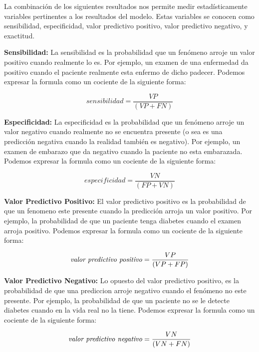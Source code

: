\documentclass[letterpaper, spanish, 11pt]{report}
\begin{document}
La combinación de los siguientes resultados nos permite medir estadísticamente variables pertinentes a los resultados del modelo. Estas variables se conocen como sensibilidad, especificidad, valor predictivo positivo, valor predictivo negativo, y exactitud.

\textbf{Sensibilidad:} La sensibilidad es la probabilidad que un fenómeno arroje un valor positivo cuando realmente lo es. Por ejemplo, un examen de una enfermedad da positivo cuando el paciente realmente esta enfermo de dicho padecer. Podemos expresar la formula como un cociente de la siguiente forma:

\begin{equation}
sensibilidad = \frac{VP}{(VP + FN)}
\end{equation}

\textbf{Especificidad:} La especificidad es la probabilidad que un fenómeno arroje un valor negativo cuando realmente no se encuentra presente (o sea es una predicción negativa cuando la realidad también es negativo). Por ejemplo, un examen de embarazo que da negativo cuando la paciente no esta embarazada. Podemos expresar la formula como un cociente de la siguiente forma:

\begin{equation}
especificidad= \frac{VN}{(FP + VN)}
\end{equation}

\textbf{Valor Predictivo Positivo:} El valor predictivo positivo es la probabilidad de que un fenomeno este presente cuando la predicción arroja un valor positivo. Por ejemplo, la probabilidad de que un paciente tenga diabetes cuando el examen arroja positivo. Podemos expresar la formula como un cociente de la siguiente forma:

\begin{equation}
\mbox{\textit{valor predictivo positivo}} = \frac{VP}{(VP + FP)}
\end{equation}

\textbf{Valor Predictivo Negativo:} Lo opuesto del valor predictivo positivo, es la probabilidad de que una prediccion arroje negativo cuando el fenómeno no este presente. Por ejemplo, la probabilidad de que un paciente no se le detecte diabetes cuando en la vida real no la tiene. Podemos expresar la formula como un cociente de la siguiente forma:

\begin{equation}
\mbox{\textit{valor predictivo negativo}} = \frac{VN}{(VN + FN)}
\end{equation}
\end{document}
